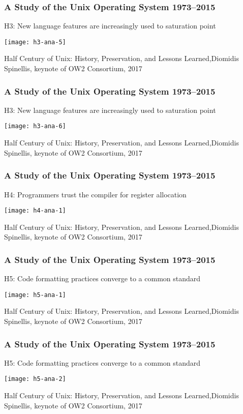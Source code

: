 \begin{frame}[plain]
	\frametitle{A Study of the Unix Operating System 1973–2015}
	\centering
	H3: New language features are
	increasingly used to saturation point
	
	
	\texttt{[image: h3-ana-5]}
	
	\tiny Half Century of Unix:
	History, Preservation, and
	Lessons Learned,Diomidis Spinellis, keynote of OW2 Consortium, 2017
	
\end{frame}	

\begin{frame}[plain]
	\frametitle{A Study of the Unix Operating System 1973–2015}
	\centering
	H3: New language features are
	increasingly used to saturation point
	
	
	\texttt{[image: h3-ana-6]}
	
	\tiny Half Century of Unix:
	History, Preservation, and
	Lessons Learned,Diomidis Spinellis, keynote of OW2 Consortium, 2017
	
\end{frame}	


\begin{frame}[plain]
	\frametitle{A Study of the Unix Operating System 1973–2015}
	\centering
	H4: Programmers trust the compiler
	for register allocation
	
	\texttt{[image: h4-ana-1]}
	
	\tiny Half Century of Unix:
	History, Preservation, and
	Lessons Learned,Diomidis Spinellis, keynote of OW2 Consortium, 2017
	
\end{frame}	

\begin{frame}[plain]
	\frametitle{A Study of the Unix Operating System 1973–2015}
	\centering
	H5: Code formatting practices
	converge to a common standard
	
	
	\texttt{[image: h5-ana-1]}
	
	\tiny Half Century of Unix:
	History, Preservation, and
	Lessons Learned,Diomidis Spinellis, keynote of OW2 Consortium, 2017
	
\end{frame}	

\begin{frame}[plain]
	\frametitle{A Study of the Unix Operating System 1973–2015}
	\centering
	H5: Code formatting practices
	converge to a common standard
	
	
	\texttt{[image: h5-ana-2]}
	
	\tiny Half Century of Unix:
	History, Preservation, and
	Lessons Learned,Diomidis Spinellis, keynote of OW2 Consortium, 2017
	
\end{frame}	


